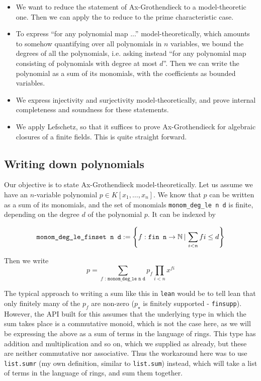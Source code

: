 \begin{itemize}
  \item We want to reduce the statement of Ax-Grothendieck to a model-theoretic one.
        Then we can apply the  to
        reduce to the prime characteristic case.
  \item To express ``for any polynomial map ...'' model-theoretically,
        which amounts to somehow quantifying over all polynomials
        in $n$ variables,
        we bound the degrees of all the polynomials,
        i.e. asking instead ``for any polynomial map consisting of
        polynomials with degree at most $d$''.
        Then we can write the polynomial as a sum of its monomials,
        with the coefficients as bounded variables.
  \item We express injectivity and surjectivity model-theoretically,
        and prove internal completeness and soundness for these statements.
  \item We apply Lefschetz, so that it suffices to prove Ax-Grothendieck for
        algebraic closures of a finite fields.
        This is quite straight forward.
\end{itemize}

\subsection{Writing down polynomials}

Our objective is to state Ax-Grothendieck model-theoretically.
Let us assume we have an $n$-variable polynomial $p \in K[x_{1},\dots,x_{n}]$.
We know that $p$ can be written as a sum of its monomials,
and the set of monomials \texttt{monom\_deg\_le n d} is finite,
depending on the degree $d$ of the polynomial $p$.
It can be indexed by

\[ \texttt{monom\_deg\_le\_finset n d} := \left\{ f : \texttt{fin n} \to \mathbb{N} \,|\, \sum_{i < n} f i \le d \right\}\]

Then we write
\[ p = \sum_{f\texttt{ : monom\_deg\_le n d}} p_{f}\prod_{i < n} x^{f i}\]

The typical approach to writing a sum like this in \texttt{lean} would be
to tell lean that only finitely many of the $p_{f}$ are non-zero
($p_{\star}$ is finitely supported - \texttt{finsupp}).
However, the API built for this assumes that the underlying
type in which the sum takes place is a commutative monoid,
which is not the case here,
as we will be expressing the above as a sum of terms
in the language of rings.
This type has addition and multiplication and so on,
which we supplied as  already,
but these are neither commutative nor associative.
Thus the workaround here was to use \texttt{list.sumr}
(my own definition, similar to \texttt{list.sum}) instead,
which will take a list of terms in the language of rings, and sum them together.


